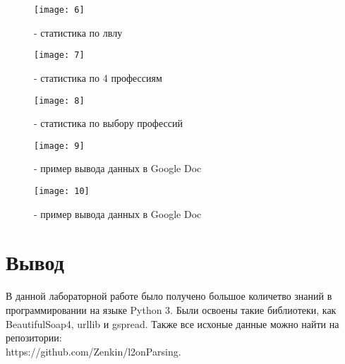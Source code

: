 \begin{figure}[H]
	\begin{center}
		\texttt{[image: 6]}
		\caption{- статистика по лвлу} 
		\label{pic:pic_7} %
	\end{center}
\end{figure}

\begin{figure}[H]
	\begin{center}
		\texttt{[image: 7]}
		\caption{- статистика по 4 профессиям} 
		\label{pic:pic_8} %
	\end{center}
\end{figure}

\begin{figure}[H]
	\begin{center}
		\texttt{[image: 8]}
		\caption{- статистика по выбору профессий} 
		\label{pic:pic_9} %
	\end{center}
\end{figure}

\begin{figure}[H]
	\begin{center}
		\texttt{[image: 9]}
		\caption{- пример вывода данных в Google Doc} 
		\label{pic:pic_10} %
	\end{center}
\end{figure}

\begin{figure}[H]
	\begin{center}
		\texttt{[image: 10]}
		\caption{- пример вывода данных в Google Doc} 
		\label{pic:pic_11} %
	\end{center}
\end{figure}

\section{Вывод}
В данной лабораторной работе было получено большое количетво знаний в программировании на языке Python 3. Были освоены такие библиотеки, как BeautifulSoap4, urllib и gspread. Также все исхоные данные можно найти на репозитории:\\ https://github.com/Zenkin/l2onParsing.

